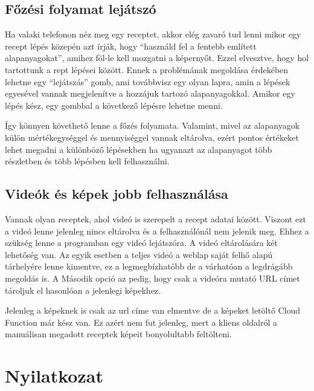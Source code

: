 \documentclass[12pt]{report}
\theoremstyle{definition}
\begin{document}
\section{Főzési folyamat lejátszó}
Ha valaki telefonon néz meg egy receptet, akkor elég zavaró tud lenni mikor egy recept lépés közepén azt írják, hogy “használd fel a fentebb említett alapanyagokat”, amihez föl-le kell mozgatni a képernyőt. Ezzel elvesztve, hogy hol tartottunk a rept lépései között. Ennek a problémának megoldása érdekében lehetne egy “lejátszás” gomb, ami továbbvisz egy olyan lapra, amin a lépések egyesével vannak megjelenítve  a hozzájuk tartozó alapanyagokkal. Amikor egy lépés kész, egy gombbal a következő lépésre lehetne menni. 

Így könnyen követhető lenne a főzés folyamata. Valamint, mivel az alapanyagok külön mértékegységgel és mennyiséggel vannak eltárolva, ezért pontos értékeket lehet megadni a különböző lépésekben ha ugyanazt az alapanyagot több részletben és több lépésben kell felhasználni.


\section{Videók és képek jobb felhasználása}
Vannak olyan receptek, ahol videó is szerepelt a recept adatai között. Viszont ezt a videó lenne  jelenleg nincs eltárolva és a felhasználónál nem jelenik meg. Ehhez a szükség lenne a programban egy videó lejátszóra. A videó eltárolására két lehetőség van. Az egyik esetben a teljes videó a weblap saját felhő alapú tárhelyére lenne kimentve, ez a legmegbízhatóbb de a várhatóan a legdrágább megoldás is. A Második opció az pedig, hogy csak a videóra mutató URL címet tároljuk el hasonlóan a jelenlegi képekhez.

Jelenleg a képeknek is csak az url címe van elmentve de a képeket letöltő Cloud Function már kész van. Ez azért nem fut jelenleg, mert a kliens oldalról a manuálisan megadott receptek képeit bonyolultabb feltölteni. 


\chapter*{Nyilatkozat}

\end{document}

